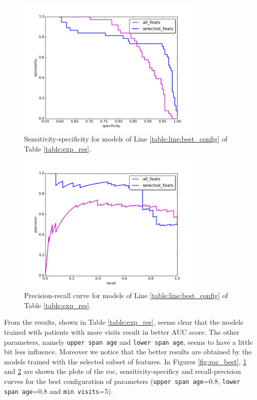 \begin{figure}[h]
	\centering
	\includegraphics[width= 0.8\textwidth]{chapter4/specificity_sensitivity_comp.png}
	\caption{Sensitivity-specificity for models of Line \ref{table:line:best_config} of Table \ref{table:exp_res}.}
	\label{fig:sensitivity_specificity_best}
\end{figure}

\begin{figure}[h]
	\centering
	\includegraphics[width= 0.8\textwidth]{chapter4/precision_recall_comp.png}
	\caption{Precision-recall curve for models of Line \ref{table:line:best_config} of Table \ref{table:exp_res}.}
	\label{fig:precision_recall_best}
\end{figure}

From the results, shown in Table \ref{table:exp_res}, seems clear that the models trained with patients with more visits result in better AUC score. The other parameters, namely \texttt{upper span age} and \texttt{lower span age}, seems to have a little bit less influence. Moreover we notice that the better results are obtained by the models trained with the selected subset of features. In Figures \ref{fig:roc_best}, \ref{fig:sensitivity_specificity_best} and \ref{fig:precision_recall_best} are shown the plots of the roc, sensitivity-specificy and recall-precision curves for the best configuration of parameters (\texttt{upper span age}=0.8, \texttt{lower span age}=0.8 and \texttt{min visits}=5).

